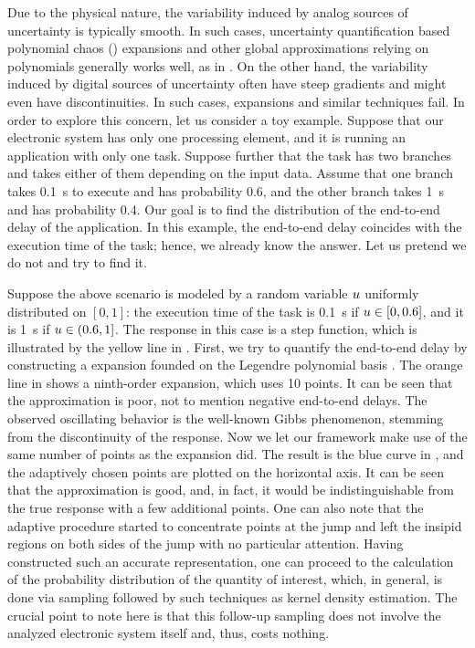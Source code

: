 
Due to the physical nature, the variability induced by analog sources of
uncertainty is typically smooth. In such cases, uncertainty quantification based
polynomial chaos () expansions \cite{xiu2010} and other global
approximations relying on polynomials generally works well, as in
\cite{bhardwaj2008, lee2013, ukhov2014, ukhov2015}. On the other hand, the
variability induced by digital sources of uncertainty often have steep gradients
and might even have discontinuities. In such cases,  expansions and
similar techniques fail. In order to explore this concern, let us consider a toy
example. Suppose that our electronic system has only one processing element, and
it is running an application with only one task. Suppose further that the task
has two branches and takes either of them depending on the input data. Assume
that one branch takes 0.1~s to execute and has probability 0.6, and the other
branch takes 1~s and has probability 0.4. Our goal is to find the distribution
of the end-to-end delay of the application. In this example, the end-to-end
delay coincides with the execution time of the task; hence, we already know the
answer. Let us pretend we do not and try to find it.

Suppose the above scenario is modeled by a random variable $u$ uniformly
distributed on $[0, 1]$: the execution time of the task is 0.1~s if $u \in [0,
0.6]$, and it is 1~s if $u \in (0.6, 1]$. The response in this case is a step
function, which is illustrated by the yellow line in . First,
we try to quantify the end-to-end delay by constructing a  expansion
founded on the Legendre polynomial basis \cite{xiu2010}. The orange line in
 shows a ninth-order  expansion, which uses 10 points.
It can be seen that the approximation is poor, not to mention negative
end-to-end delays. The observed oscillating behavior is the well-known Gibbs
phenomenon, stemming from the discontinuity of the response. Now we let our
framework make use of the same number of points as the  expansion did.
The result is the blue curve in , and the adaptively chosen
points are plotted on the horizontal axis. It can be seen that the approximation
is good, and, in fact, it would be indistinguishable from the true response with
a few additional points. One can also note that the adaptive procedure started
to concentrate points at the jump and left the insipid regions on both sides of
the jump with no particular attention. Having constructed such an accurate
representation, one can proceed to the calculation of the probability
distribution of the quantity of interest, which, in general, is done via
sampling followed by such techniques as kernel density estimation. The crucial
point to note here is that this follow-up sampling does not involve the analyzed
electronic system itself and, thus, costs nothing.

